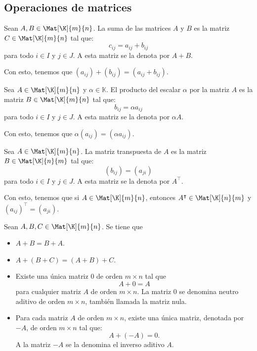 \documentclass[a4,11pt]{aleph-notas}
\begin{document}
\subsection{Operaciones de matrices}

\begin{defi}
    Sean $A, B \in \Mat[\K]{m}{n}$. La suma de las matrices $A$ y $B$ es la matriz $C\in \Mat[\K]{m}{n}$ tal que:
    \[ 
        c_{ij} = a_{ij} + b_{ij}
    \]
    para todo $i \in I$ y $j \in J$. A esta matriz se la denota por $A+B$.
\end{defi}

\begin{advertencia}
    Con esto, tenemos que $(a_{ij})+(b_{ij})=(a_{ij} + b_{ij})$.
\end{advertencia}

\begin{defi}
    Sea $A\in \Mat[\K]{m}{n}$ y $\alpha \in \mathbb{K}$. El producto del escalar $\alpha$ por la matriz $A$ es la matriz $B\in \Mat[\K]{m}{n}$ tal que:
    \[ 
        b_{ij} = \alpha a_{ij}
    \]
    para todo $i \in I$ y $j \in J$. A esta matriz se la denota por $\alpha A$.
\end{defi}

\begin{advertencia}
    Con esto, tenemos que $\alpha (a_{ij}) =(\alpha a_{ij})$.
\end{advertencia}

\begin{defi}
    Sea $A \in \Mat[\K]{m}{n}$. La matriz transpuesta de $A$ es la matriz $B\in \Mat[\K]{n}{m}$ tal que: 
    \[
        (b_{ij}) = (a_{ji})
    \]
    para todo $i\in I$ y $j \in J$. A esta matriz se la denota por $A^\intercal$.
\end{defi}

\begin{advertencia}
    Con esto, tenemos que si $A\in \Mat[\K]{m}{n}$, entonces $A^\intercal\in \Mat[\K]{n}{m}$ y $(a_{ij})^\intercal =(a_{ji})$.
\end{advertencia}

\begin{teo}
    Sean $A,B,C\in\Mat[\K]{m}{n}$. Se tiene que
    \begin{itemize}
    \item 
        $A + B = B + A$.
    \item 
        $A + (B+C) = (A + B)+C$.
    \item 
        Existe una única matriz $0$ de orden $m \times n$ tal que 
        \[ 
            A + 0 =  A 
        \]
        para cualquier matriz $A$ de orden $m \times n$. La matriz $0$ se denomina neutro aditivo de orden $m \times n$, también llamada la matriz nula.
    \item 
        Para cada matriz $A$ de orden $m \times n$, existe una única matriz, denotada por $-A$, de orden $m \times n$ tal que:
        \[
            A + (-A) = 0.
        \]
        A la matriz $-A$ se la denomina el inverso aditivo $A$.
    \end{itemize}
\end{teo}
\end{document}
